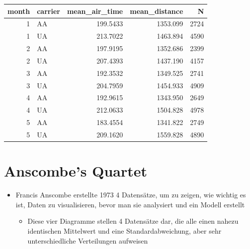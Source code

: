 \documentclass[
  letterpaper,
  DIV=11]{scrartcl}
\providecommand{\tightlist}{%
  \setlength{\itemsep}{0pt}\setlength{\parskip}{0pt}}\usepackage{longtable,booktabs,array}
\begin{document}
\begin{tcolorbox}
\begin{table}
\centering\begingroup\fontsize{20}{22}\selectfont

\begin{tabular}{r|l|r|r|r}
\hline
month & carrier & mean\_air\_time & mean\_distance & N\\
\hline
1 & AA & 199.5433 & 1353.099 & 2724\\
\hline
1 & UA & 213.7022 & 1463.894 & 4590\\
\hline
2 & AA & 197.9195 & 1352.686 & 2399\\
\hline
2 & UA & 207.4393 & 1437.190 & 4157\\
\hline
3 & AA & 192.3532 & 1349.525 & 2741\\
\hline
3 & UA & 204.7959 & 1454.933 & 4909\\
\hline
4 & AA & 192.9615 & 1343.950 & 2649\\
\hline
4 & UA & 212.0633 & 1504.828 & 4978\\
\hline
5 & AA & 183.4554 & 1341.822 & 2749\\
\hline
5 & UA & 209.1620 & 1559.828 & 4890\\
\hline
\end{tabular}
\endgroup{}
\end{table}

\end{tcolorbox}

\hypertarget{anscombes-quartet}{%
\section{Anscombe's Quartet}\label{anscombes-quartet}}

\begin{itemize}
\tightlist
\item
  Francis Anscombe erstellte 1973 4 Datensätze, um zu zeigen, wie
  wichtig es ist, Daten zu visualisieren, bevor man sie analysiert und
  ein Modell erstellt

  \begin{itemize}
  \tightlist
  \item
    Diese vier Diagramme stellen 4 Datensätze dar, die alle einen nahezu
    identischen Mittelwert und eine Standardabweichung, aber sehr
    unterschiedliche Verteilungen aufweisen
  \end{itemize}
\end{itemize}
\end{document}

